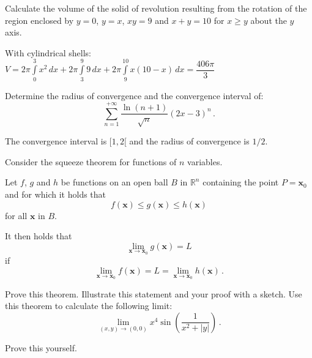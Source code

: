 \begin{Exercise} %
Calculate the volume of the solid of revolution resulting from the rotation of the region enclosed by $y=0$, $y=x$, $xy=9$ and $x+y=10$ for $x\geq y$ about the $ y$ axis. 
\end{Exercise}

\begin{Answer}\phantom{}
With cylindrical shells: \\

$V = 2 \pi \displaystyle \int \limits_0^3 x^2 \, dx + 2 \pi \displaystyle \int \limits_3^9 9 \, dx + 2 \pi \displaystyle \int \limits_9^{10} x(10-x) \, dx = \dfrac{406 \pi}{3}$
\end{Answer}

\begin{Exercise} %
Determine the radius of convergence and the convergence interval of:
$$
\sum\limits_{n=1}^{+\infty}\dfrac{\ln(n+1)}{\sqrt{n}}\left(2x-3\right)^n\,.
$$
\end{Exercise}

\begin{Answer}\phantom{}
The convergence interval is $[1,2[$ and the radius of convergence is $1/2$.
\end{Answer}


\begin{Exercise} %
Consider the squeeze theorem for functions of $n$ variables.

\begin{theorem}\label{thm:sqz2}
Let $f$, $g$ and $h$ be functions on an open ball $B$ in $\mathbb{R}^n$ containing the point $P=\mathbf{x}_0$ and for which it holds that
$$f(\mathbf{x})\leq g(\mathbf{x}) \leq h(\mathbf{x})$$ 
for all $\mathbf{x}$ in $B$. 

It then holds that
$$\lim_{\mathbf{x}\to \mathbf{x}_0} g(\mathbf{x}) = L$$ 
if
$$\lim_{\mathbf{x}\to \mathbf{x}_0} f(\mathbf{x}) = L = \lim_{\mathbf{x}\to \mathbf{x}_0} h(\mathbf{x})\,.$$
\end{theorem}

\Question Prove this theorem.
\Question Illustrate this statement and your proof with a sketch.
\Question Use this theorem to calculate the following limit:
    $$
    \lim_{(x,y)\to (0,0)} x^4\sin\left(\dfrac{1}{x^2+|y|}\right)\,.
    $$
\EndCurrentQuestion
\end{Exercise} 

\begin{Answer}\phantom{}
Prove this yourself.
\end{Answer}


